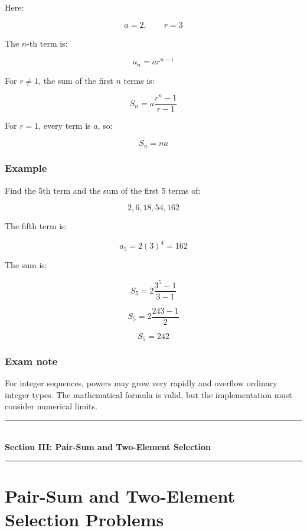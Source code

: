 Here:


\[
a=2,\qquad r=3
\]


The $n$-th term is:


\[
\boxed{a_n=ar^{n-1}}
\]


For $r\neq1$, the sum of the first $n$ terms is:


\[
\boxed{S_n=a\frac{r^n-1}{r-1}}
\]


For $r=1$, every term is $a$, so:


\[
\boxed{S_n=na}
\]


\subsubsection{Example}

Find the 5th term and the sum of the first 5 terms of:


\[
2,6,18,54,162
\]


The fifth term is:


\[
a_5=2(3)^4=\boxed{162}
\]


The sum is:


\[
S_5=2\frac{3^5-1}{3-1}
\]



\[
S_5=2\frac{243-1}{2}
\]



\[
\boxed{S_5=242}
\]


\subsubsection{Exam note}

For integer sequences, powers may grow very rapidly and overflow ordinary integer types. The mathematical formula is valid, but the implementation must consider numerical limits.


\newpage
\begin{center}
\vspace{0.5em}
{\color{primary}\rule{0.45\textwidth}{1.2pt}}\\[4pt]
{\Large\bfseries\color{primary} Section III: Pair-Sum and Two-Element Selection}\\[2pt]
{\color{primary}\rule{0.45\textwidth}{1.2pt}}
\vspace{0.5em}
\end{center}

\section{Pair-Sum and Two-Element Selection Problems}



